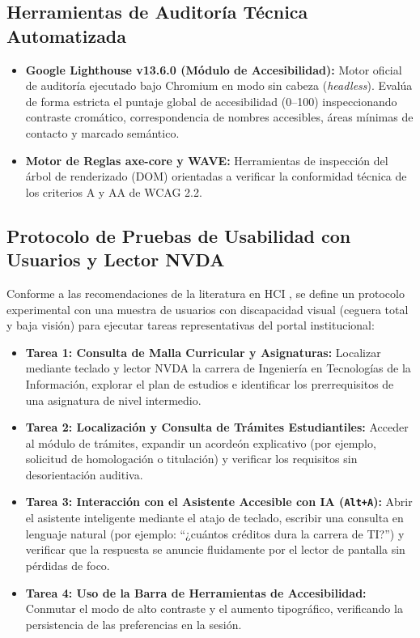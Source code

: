 \subsection{Herramientas de Auditoría Técnica Automatizada}
\begin{itemize}
  \item \textbf{Google Lighthouse v13.6.0 (Módulo de Accesibilidad):} Motor oficial de auditoría ejecutado bajo Chromium en modo sin cabeza (\textit{headless}). Evalúa de forma estricta el puntaje global de accesibilidad (0--100) inspeccionando contraste cromático, correspondencia de nombres accesibles, áreas mínimas de contacto y marcado semántico.
  \item \textbf{Motor de Reglas axe-core y WAVE:} Herramientas de inspección del árbol de renderizado (DOM) orientadas a verificar la conformidad técnica de los criterios A y AA de WCAG 2.2.
\end{itemize}

\subsection{Protocolo de Pruebas de Usabilidad con Usuarios y Lector NVDA}
Conforme a las recomendaciones de la literatura en HCI \cite{campoverde2020empirical,brooke1996sus}, se define un protocolo experimental con una muestra de usuarios con discapacidad visual (ceguera total y baja visión) para ejecutar tareas representativas del portal institucional:
\begin{itemize}
  \item \textbf{Tarea 1: Consulta de Malla Curricular y Asignaturas:} Localizar mediante teclado y lector NVDA la carrera de Ingeniería en Tecnologías de la Información, explorar el plan de estudios e identificar los prerrequisitos de una asignatura de nivel intermedio.
  \item \textbf{Tarea 2: Localización y Consulta de Trámites Estudiantiles:} Acceder al módulo de trámites, expandir un acordeón explicativo (por ejemplo, solicitud de homologación o titulación) y verificar los requisitos sin desorientación auditiva.
  \item \textbf{Tarea 3: Interacción con el Asistente Accesible con IA (\texttt{Alt+A}):} Abrir el asistente inteligente mediante el atajo de teclado, escribir una consulta en lenguaje natural (por ejemplo: ``¿cuántos créditos dura la carrera de TI?'') y verificar que la respuesta se anuncie fluidamente por el lector de pantalla sin pérdidas de foco.
  \item \textbf{Tarea 4: Uso de la Barra de Herramientas de Accesibilidad:} Conmutar el modo de alto contraste y el aumento tipográfico, verificando la persistencia de las preferencias en la sesión.
\end{itemize}

